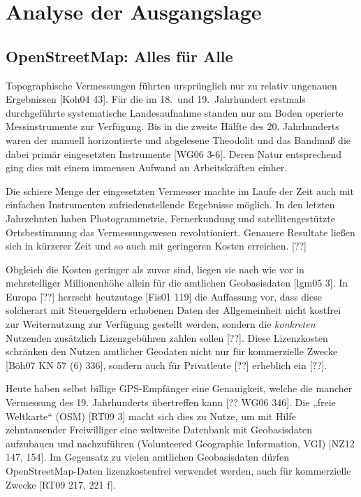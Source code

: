 \documentclass{../thesis}
\begin{document}
\chapter{Analyse der Ausgangslage}

\section{OpenStreetMap: Alles für Alle}

Topographische Vermessungen führten ursprünglich nur zu relativ ungenauen Ergebnissen [Koh04 43]. Für die im 18.~und 19.~Jahrhundert erstmals durchgeführte systematische Landesaufnahme standen nur am Boden operierte Messinstrumente zur Verfügung. Bis in die zweite Hälfte des 20. Jahrhunderts waren der manuell horizontierte und abgelesene Theodolit und das Bandmaß die dabei primär eingesetzten Instrumente [WG06 3-6]. Deren Natur entsprechend ging dies mit einem immensen Aufwand an Arbeitskräften einher.

Die schiere Menge der eingesetzten Vermesser machte im Laufe der Zeit auch mit einfachen Instrumenten zufriedenstellende Ergebnisse möglich. In den letzten Jahrzehnten haben Photogrammetrie, Fernerkundung und satellitengestützte Ortsbestimmung das Vermessungswesen revolutioniert. Genauere Resultate ließen sich in kürzerer Zeit und so auch mit geringeren Kosten erreichen. [??]


Obgleich die Kosten geringer als zuvor sind, liegen sie nach wie vor in mehrstelliger Millionenhöhe allein für die amtlichen Geobasisdaten [lgm05 3].
In Europa [??] herrscht heutzutage [Fis01 119] die Auffassung vor, dass diese solcherart mit Steuergeldern erhobenen Daten der Allgemeinheit nicht kostfrei zur Weiternutzung zur Verfügung gestellt werden, sondern die \emph{konkreten} Nutzenden zusätzlich Lizenzgebühren zahlen sollen [??]. Diese Lizenzkosten schränken den Nutzen amtlicher Geodaten nicht nur für kommerzielle Zwecke [Böh07 KN 57 (6) 336], sondern auch für Privatleute [??] erheblich ein [??].


Heute haben selbst billige GPS-Empfänger eine Genauigkeit, welche die mancher Vermessung des 19. Jahrhunderts übertreffen kann [?? WG06 346]. Die „freie Weltkarte“  (OSM) [RT09 3] macht sich dies zu Nutze, um mit Hilfe zehntausender Freiwilliger eine weltweite Datenbank mit Geobasisdaten aufzubauen und nachzuführen (Volunteered Geographic Information, VGI) [NZ12 147, 154]. Im Gegensatz zu vielen amtlichen Geobasisdaten dürfen OpenStreetMap-Daten lizenzkostenfrei verwendet werden, auch für kommerzielle Zwecke [RT09 217, 221 f].
\end{document}
